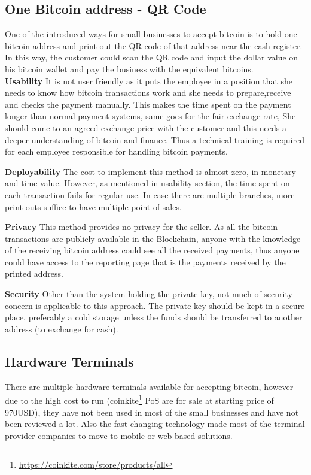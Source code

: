 \subsection{One Bitcoin address - QR Code} 
One of the introduced ways for small businesses to accept bitcoin is to hold one bitcoin address and print out the QR code of that address near the cash register. In this way, the customer could scan the QR code and input the dollar value on his bitcoin wallet and pay the business with the equivalent bitcoins. \\

\textbf{Usability} It is not user friendly as it puts the employee in a position that she needs to know how bitcoin transactions work and she needs to prepare,receive and checks the payment manually. This makes the time spent on the payment longer than normal payment systems, same goes for the fair exchange rate, She should come to an agreed exchange price with the customer and this needs a deeper understanding of bitcoin and finance. Thus a technical training is required for each employee responsible for handling bitcoin payments.

\textbf{Deployability} The cost to implement this method is almost zero, in monetary and time value. However, as mentioned in usability section, the time spent on each transaction fails for regular use. In case there are multiple branches, more print outs suffice to have multiple point of sales.

\textbf{Privacy} This method provides no privacy for the seller. As all the bitcoin transactions are publicly available in the Blockchain, anyone with the knowledge of the receiving bitcoin address could see all the received payments, thus anyone could have access to the reporting page that is the payments received by the printed address.

\textbf{Security} Other than the system holding the private key, not much of security concern is applicable to this approach. The private key should be kept in a secure place, preferably a cold storage unless the funds should be transferred to another address (\eg to exchange for cash).

\subsection{Hardware Terminals}
There are multiple hardware terminals available for accepting bitcoin, however due to the high cost to run (\eg coinkite\footnote{\url{https://coinkite.com/store/products/all}} PoS are for sale at starting price of 970USD), they have not been used in most of the small businesses and have not been reviewed a lot. Also the fast changing technology made most of the terminal provider companies to move to mobile or web-based solutions.

